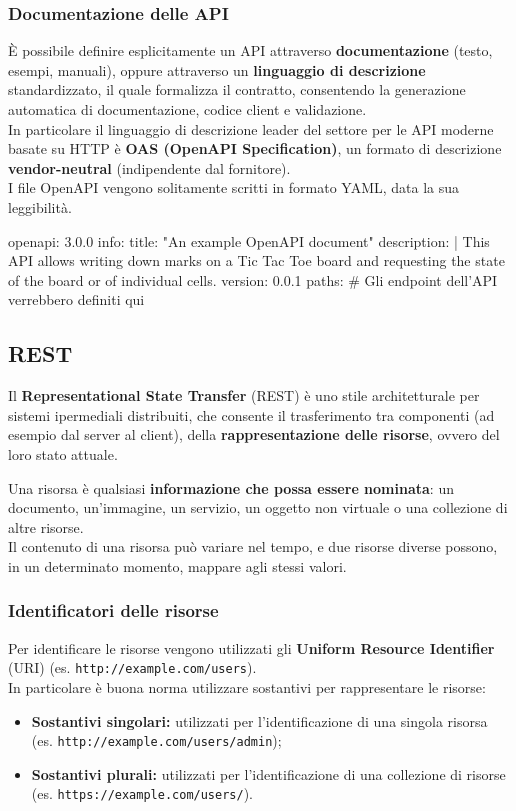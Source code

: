 \documentclass[12pt]{article}
\begin{document}
\subsubsection{Documentazione delle API}
È possibile definire esplicitamente un API attraverso \textbf{documentazione} (testo, esempi, manuali),
oppure attraverso un \textbf{linguaggio di descrizione} standardizzato, il quale formalizza il contratto, consentendo la generazione automatica di documentazione, codice client e validazione.\\
In particolare il linguaggio di descrizione leader del settore per le API moderne basate su HTTP è \textbf{OAS (OpenAPI Specification)}, un formato di descrizione \textbf{vendor-neutral} (indipendente dal fornitore).\\
I file OpenAPI vengono solitamente scritti in formato YAML, data la sua leggibilità.
\begin{code}[language=YAML]
  openapi: 3.0.0
  info:
    title: "An example OpenAPI document"
    description: |
      This API allows writing down marks on a Tic Tac Toe board
      and requesting the state of the board or of individual cells.
    version: 0.0.1
  paths: {} # Gli endpoint dell'API verrebbero definiti qui
\end{code}

\subsection{REST}
Il \textbf{Representational State Transfer} (REST) è uno stile architetturale per sistemi ipermediali distribuiti,
che consente il trasferimento tra componenti (ad esempio dal server al client), della \textbf{rappresentazione delle risorse}, ovvero del loro stato attuale.
\begin{definition}[Risorsa]
Una risorsa è qualsiasi \textbf{informazione che possa essere nominata}:
un documento, un'immagine, un servizio, un oggetto non virtuale o una collezione di altre risorse.\\
Il contenuto di una risorsa può variare nel tempo, e due risorse diverse possono, in un determinato momento, mappare agli stessi valori.
\end{definition}

\subsubsection{Identificatori delle risorse}
Per identificare le risorse vengono utilizzati gli \textbf{Uniform Resource Identifier} (URI) (es. \texttt{http://example.com/users}).\\
In particolare è buona norma utilizzare sostantivi per rappresentare le risorse:
\begin{itemize}
  \item \textbf{Sostantivi singolari:} utilizzati per l'identificazione di una singola risorsa (es. \texttt{http://example.com/users/admin});
  \item \textbf{Sostantivi plurali:} utilizzati per l'identificazione di una collezione di risorse (es. \texttt{https://example.com/users/}).
\end{itemize}
\end{document}
